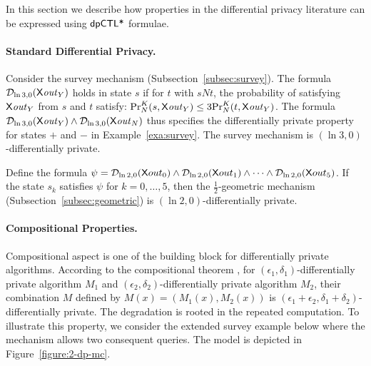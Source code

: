 In this section we describe how properties in the differential privacy literature can be expressed using $\dpCTLstar$ formulae.

\paragraph{Standard Differential Privacy.}
Consider the survey mechanism (Subsection~\ref{subsec:survey}). The formula $\dpriv{\ln 3}{0} (\X \mathit{out}_Y)$ holds in state $s$ if for  $t$ with $sNt$, the probability of satisfying $\X \mathit{out}_Y$ from $s$ and $t$ satisfy:
$\myPr{s}{K}{N}{\X \mathit{out}_Y}\le 3\myPr{t}{K}{N}{\X \mathit{out}_Y}$. The formula $\dpriv{\ln 3}{0} (\X \mathit{out}_Y)\wedge \dpriv{\ln 3}{0} (\X \mathit{out}_N)$ thus specifies the differentially private property for states $+$ and $-$ in Example~\ref{exa:survey}.
The survey mechanism is
$(\ln 3, 0)$-differentially private.



 Define the formula
$\psi = \dpriv{\ln 2}{0} (\X out_0) \wedge \dpriv{\ln 2}{0} (\X out_1) \wedge
\cdots \wedge \dpriv{\ln 2}{0} (\X out_5)$. If the state $s_k$ satisfies
$\psi$ for $k = 0, \ldots, 5$, then the $\frac{1}{2}$-geometric mechanism (Subsection~\ref{subsec:geometric}) is
$(\ln 2, 0)$-differentially private.


\paragraph{Compositional Properties.}
Compositional aspect is one of the building block for differentially private algorithms. According to the compositional theorem \cite[Theorem 3.16]{DR:14:AFDP}, for $(\epsilon_1,\delta_1)$-differentially private algorithm $M_1$ and
$(\epsilon_2,\delta_2)$-differentially private algorithm $M_2$, their combination $M$ defined by $M(x)=(M_1(x), M_2(x))$ is $(\epsilon_1 + \epsilon_2,\delta_1+\delta_2)$-differentially private. The degradation is rooted in the repeated computation. To illustrate this property, we consider the extended survey example below where the mechanism allows two consequent queries.
The model is depicted in Figure~\ref{figure:2-dp-mc}.

